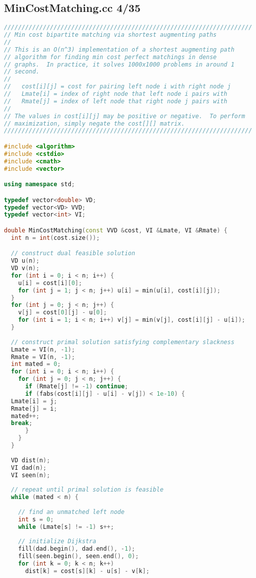 \subsection{MinCostMatching.cc 4/35}
\begin{lstlisting}[language=C++]
//////////////////////////////////////////////////////////////////////
// Min cost bipartite matching via shortest augmenting paths
//
// This is an O(n^3) implementation of a shortest augmenting path
// algorithm for finding min cost perfect matchings in dense
// graphs.  In practice, it solves 1000x1000 problems in around 1
// second.
//
//   cost[i][j] = cost for pairing left node i with right node j
//   Lmate[i] = index of right node that left node i pairs with
//   Rmate[j] = index of left node that right node j pairs with
//
// The values in cost[i][j] may be positive or negative.  To perform
// maximization, simply negate the cost[][] matrix.
//////////////////////////////////////////////////////////////////////

#include <algorithm>
#include <cstdio>
#include <cmath>
#include <vector>

using namespace std;

typedef vector<double> VD;
typedef vector<VD> VVD;
typedef vector<int> VI;

double MinCostMatching(const VVD &cost, VI &Lmate, VI &Rmate) {
  int n = int(cost.size());

  // construct dual feasible solution
  VD u(n);
  VD v(n);
  for (int i = 0; i < n; i++) {
    u[i] = cost[i][0];
    for (int j = 1; j < n; j++) u[i] = min(u[i], cost[i][j]);
  }
  for (int j = 0; j < n; j++) {
    v[j] = cost[0][j] - u[0];
    for (int i = 1; i < n; i++) v[j] = min(v[j], cost[i][j] - u[i]);
  }
  
  // construct primal solution satisfying complementary slackness
  Lmate = VI(n, -1);
  Rmate = VI(n, -1);
  int mated = 0;
  for (int i = 0; i < n; i++) {
    for (int j = 0; j < n; j++) {
      if (Rmate[j] != -1) continue;
      if (fabs(cost[i][j] - u[i] - v[j]) < 1e-10) {
  Lmate[i] = j;
  Rmate[j] = i;
  mated++;
  break;
      }
    }
  }
  
  VD dist(n);
  VI dad(n);
  VI seen(n);
  
  // repeat until primal solution is feasible
  while (mated < n) {
    
    // find an unmatched left node
    int s = 0;
    while (Lmate[s] != -1) s++;
    
    // initialize Dijkstra
    fill(dad.begin(), dad.end(), -1);
    fill(seen.begin(), seen.end(), 0);
    for (int k = 0; k < n; k++) 
      dist[k] = cost[s][k] - u[s] - v[k];
    

\end{lstlisting}
